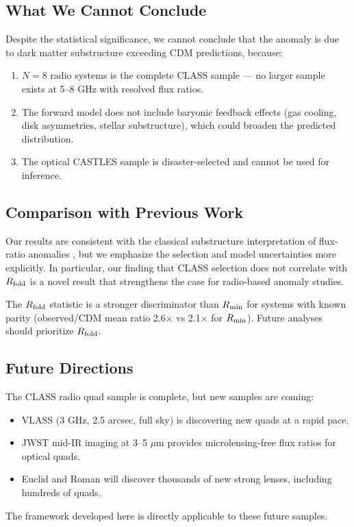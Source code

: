 \documentclass[12pt]{article}
\newcommand{\rfold}{\ensuremath{R_{\rm fold}}}
\newcommand{\rmin}{\ensuremath{R_{\rm min}}}
\begin{document}
\subsection{What We Cannot Conclude}

Despite the statistical significance, we cannot conclude that the anomaly
is due to dark matter substructure exceeding CDM predictions, because:
\begin{enumerate}
\item $N=8$ radio systems is the complete CLASS sample --- no larger
sample exists at 5--8 GHz with resolved flux ratios.
\item The forward model does not include baryonic feedback effects
(gas cooling, disk asymmetries, stellar substructure), which could
broaden the predicted distribution.
\item The optical CASTLES sample is disaster-selected and cannot
be used for inference.
\end{enumerate}

\subsection{Comparison with Previous Work}

Our results are consistent with the classical substructure interpretation
of flux-ratio anomalies \cite{DalalKochanek2002, Xu2015}, but we emphasize
the selection and model uncertainties more explicitly. In particular,
our finding that CLASS selection does not correlate with \rfold{}
is a novel result that strengthens the case for radio-based anomaly studies.

The \rfold{} statistic is a stronger discriminator than \rmin{} for
systems with known parity (observed/CDM mean ratio 2.6$\times$ vs 2.1$\times$
for \rmin{}). Future analyses should prioritize \rfold{}.

\subsection{Future Directions}

The CLASS radio quad sample is complete, but new samples are coming:
\begin{itemize}
\item VLASS (3 GHz, 2.5 arcsec, full sky) is discovering new quads
at a rapid pace.
\item JWST mid-IR imaging at 3--5 $\mu$m provides microlensing-free
flux ratios for optical quads.
\item Euclid and Roman will discover thousands of new strong lenses,
including hundreds of quads.
\end{itemize}
The framework developed here is directly applicable to these future samples.
\end{document}
